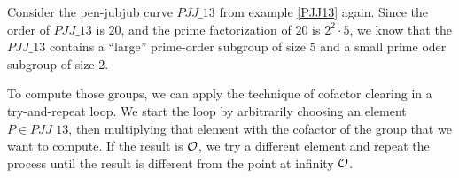 \begin{example}\label{ex:PJJ13-cofactor-clearing} Consider the pen-jubjub curve $\mathit{PJJ\_13}$ from example \ref{PJJ13} again. Since the order of $\mathit{PJJ\_13}$ is $20$, and the prime factorization of $20$ is $2^2\cdot 5$, we know that the $\mathit{PJJ\_13}$ contains a ``large'' prime-order subgroup of size $5$ and a small prime oder subgroup of size $2$. 

To compute those groups, we can apply the technique of cofactor clearing in a try-and-repeat loop. We start the loop by arbitrarily choosing an element $P\in \mathit{PJJ\_13}$, then multiplying that element with the cofactor of the group that we want to compute. If the result is $\mathcal{O}$, we try a different element and repeat the process until the result is different from the point at infinity $\mathcal{O}$.  


\end{example}
